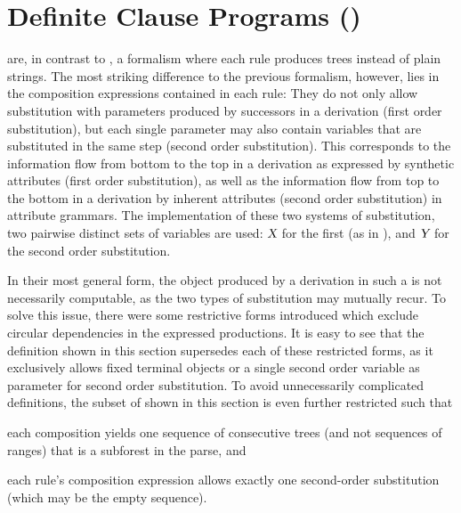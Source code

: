 \documentclass[../../document.tex]{subfiles}
\begin{document}
    \section{Definite Clause Programs ()}
     are, in contrast to , a formalism where each rule produces trees instead of plain strings.
    The most striking difference to the previous formalism, however, lies in the composition expressions contained in each rule:
    They do not only allow substitution with parameters produced by successors in a derivation (first order substitution), but each single parameter may also contain variables that are substituted in the same step (second order substitution).
    This corresponds to the information flow from bottom to the top in a derivation as expressed by synthetic attributes (first order substitution), as well as the information flow from top to the bottom in a derivation by inherent attributes (second order substitution) in attribute grammars.
    The implementation of these two systems of substitution, two pairwise distinct sets of variables are used: \(\textsl{X}\) for the first (as in ), and \(\textsl{Y}\) for the second order substitution.

    In their most general form, the object produced by a derivation in such a  is not necessarily computable, as the two types of substitution may mutually recur.
    To solve this issue, there were some restrictive forms introduced which exclude circular dependencies in the expressed productions. \citep[Sec.~3.4 about non-circular attribute grammars]{Cou82}
    It is easy to see that the definition shown in this section supersedes each of these restricted forms, as it exclusively allows fixed terminal objects or a single second order variable as parameter for second order substitution.
    To avoid unnecessarily complicated definitions, the subset of  shown in this section is even further restricted such that
    \begin{inparaenum}
        \item each composition yields one sequence of consecutive trees (and not sequences of ranges) that is a subforest in the parse, and
        \item each rule's composition expression allows exactly one second-order substitution (which may be the empty sequence).
    \end{inparaenum}
\end{document}
